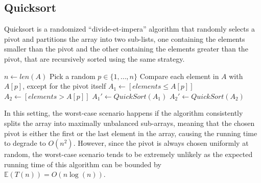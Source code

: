 \documentclass{report}
\begin{document}
\subsection{Quicksort}
Quicksort is a randomized ``divide-et-impera'' algorithm that randomly selects a pivot and partitions the array into two sub-lists, one containing the elements smaller than the pivot and the other containing the elements greater than the pivot, that are recursively sorted using the same strategy.

\begin{algorithm}[H]
    \caption{The Quicksort algorithm.}
    
    $n \gets len(A)$\;
    Pick a random $p \in \{1, \dots, n\}$\;
    Compare each element in $A$ with $A[p]$, except for the pivot itself\;
    $A_1 \gets [elements \leq A[p]]$\;
    $A_2 \gets [elements > A[p]]$\;
    $A_1' \gets QuickSort(A_1)$\;
    $A_2' \gets QuickSort(A_2)$\;
    \;
\end{algorithm}
\noindent In this setting, the worst-case scenario happens if the algorithm consistently splits the array into maximally unbalanced sub-arrays, meaning that the chosen pivot is either the first or the last element in the array, causing the running time to degrade to $\displaystyle O(n^2)$. \newline
However, since the pivot is always chosen uniformly at random, the worst-case scenario tends to be extremely unlikely as the expected running time of this algorithm can be bounded by $\displaystyle \mathbb{E}(T(n)) = O(n\log(n))$.
\end{document}
